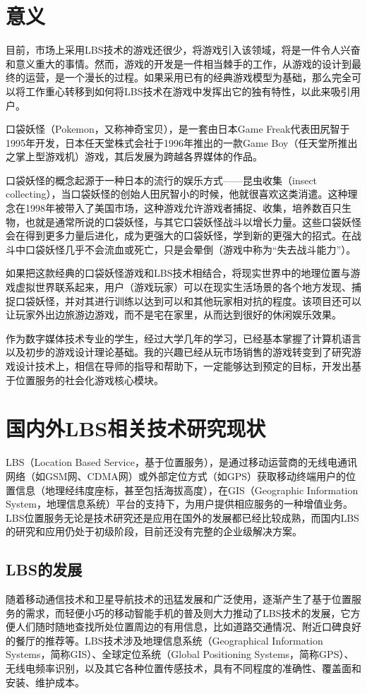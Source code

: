 \documentclass{article}
\begin{document}
\begin{CJK}{UTF8}{gbsn}
	\section{意义}
	目前，市场上采用LBS技术的游戏还很少，将游戏引入该领域，将是一件令人兴奋和意义重大的事情。然而，游戏的开发是一件相当棘手的工作，从游戏的设计到最终的运营，是一个漫长的过程。如果采用已有的经典游戏模型为基础，那么完全可以将工作重心转移到如何将LBS技术在游戏中发挥出它的独有特性，以此来吸引用户。

	口袋妖怪（Pokemon，又称神奇宝贝），是一套由日本Game Freak代表田尻智于1995年开发，日本任天堂株式会社于1996年推出的一款Game Boy（任天堂所推出之掌上型游戏机）游戏，其后发展为跨越各界媒体的作品。

	口袋妖怪的概念起源于一种日本的流行的娱乐方式——昆虫收集（insect collecting），当口袋妖怪的创始人田尻智小的时候，他就很喜欢这类消遣。这种理念在1998年被带入了美国市场，这种游戏允许游戏者捕捉、收集，培养数百只生物，也就是通常所说的口袋妖怪，与其它口袋妖怪战斗以增长力量。这些口袋妖怪会在得到更多力量后进化，成为更强大的口袋妖怪，学到新的更强大的招式。在战斗中口袋妖怪几乎不会流血或死亡，只是会晕倒（游戏中称为“失去战斗能力”）。

	如果把这款经典的口袋妖怪游戏和LBS技术相结合，将现实世界中的地理位置与游戏虚拟世界联系起来，用户（游戏玩家）可以在现实生活场景的各个地方发现、捕捉口袋妖怪，并对其进行训练以达到可以和其他玩家相对抗的程度。该项目还可以让玩家外出边旅游边游戏，而不是宅在家里，从而达到很好的休闲娱乐效果。	

	作为数字媒体技术专业的学生，经过大学几年的学习，已经基本掌握了计算机语言以及初步的游戏设计理论基础。我的兴趣已经从玩市场销售的游戏转变到了研究游戏设计技术上，相信在导师的指导和帮助下，一定能够达到预定的目标，开发出基于位置服务的社会化游戏核心模块。


	\section{国内外LBS相关技术研究现状}
  LBS（Location Based Service，基于位置服务），是通过移动运营商的无线电通讯网络（如GSM网、CDMA网）或外部定位方式（如GPS）获取移动终端用户的位置信息（地理经纬度座标，甚至包括海拔高度），在GIS（Geographic Information System，地理信息系统）平台的支持下，为用户提供相应服务的一种增值业务。LBS位置服务无论是技术研究还是应用在国外的发展都已经比较成熟，而国内LBS的研究和应用仍处于初级阶段，目前还没有完整的企业级解决方案\cite{L06}。

	\subsection{LBS的发展}
  随着移动通信技术和卫星导航技术的迅猛发展和广泛使用，逐渐产生了基于位置服务的需求，而轻便小巧的移动智能手机的普及则大力推动了LBS技术的发展，它方便人们随时随地查找所处位置周边的有用信息，比如道路交通情况、附近口碑良好的餐厅的推荐等。LBS技术涉及地理信息系统（Geographical Information Systems，简称GIS）、全球定位系统（Global Positioning Systems，简称GPS）、无线电频率识别，以及其它各种位置传感技术，具有不同程度的准确性、覆盖面和安装、维护成本\cite{L02}。


\end{CJK}
\end{document}
